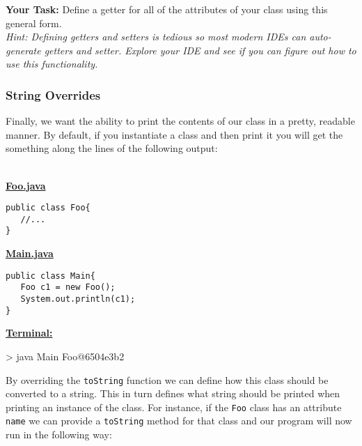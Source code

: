 \textbf{Your Task:} Define a getter for all of the attributes of your class
using this general form.\\


\textit{Hint: Defining getters and setters is tedious so most modern IDEs can
auto-generate getters and setter. Explore your IDE and see if you can figure
out how to use this functionality.}

\subsubsection{String Overrides}

Finally, we want the ability to print the contents of our class in a pretty,
readable manner. By default, if you instantiate a class and then print it 
you will get the something along the lines of the following output:\\
\vspace{0.2cm}\\

\begin{framed}
\begin{minipage}{0.25\textwidth}
\underline{\textbf{Foo.java}}
\begin{lstlisting}
public class Foo{
   //...
}
\end{lstlisting}
\end{minipage}
\hfill
\vline
\hfill
\begin{minipage}{0.32\textwidth}
\underline{\textbf{Main.java}}
\begin{lstlisting}
public class Main{
   Foo c1 = new Foo();
   System.out.println(c1);
}
\end{lstlisting}
\end{minipage}
\hfill
\vline
\hfill
\begin{minipage}{0.28\textwidth}
\underline{\textbf{Terminal:}}
\begin{shell}
> java Main
Foo@6504e3b2
\end{shell}
\end{minipage}
\end{framed}
\vspace{0.2cm}

By overriding the \lstinline|toString| function we can define how this class
should be converted to a string. This in turn defines what string should be
printed when printing an instance of the class. For instance, if the
\lstinline|Foo| class has an attribute \lstinline|name| we can provide a 
\lstinline|toString| method for that class and our program will now run
in the following way:\\
\vspace{0.2cm}\\


